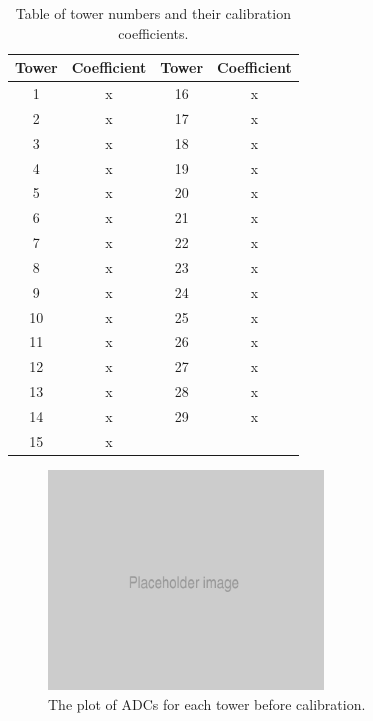 \begin{table}[h]
\centering
	\begin{tabular}{ c c | c c }
	\hline \hline
	\textbf{Tower} & \textbf{Coefficient} & \textbf{Tower} & \textbf{Coefficient} \\ \hline \hline
	 1 & x & 16 & x \\
	 2 & x & 17 & x \\
	 3 & x & 18 & x \\
	 4 & x & 19 & x \\
	 5 & x & 20 & x \\
	 6 & x & 21 & x \\
	 7 & x & 22 & x \\
	 8 & x & 23 & x \\
	 9 & x & 24 & x \\
	10 & x & 25 & x \\
	11 & x & 26 & x \\
	12 & x & 27 & x \\
	13 & x & 28 & x \\
	14 & x & 29 & x \\
	15 & x &    &    \\ \hline
	\end{tabular}
	\caption{Table of tower numbers and their calibration coefficients.}
	\label{table:idea/calibrationcoeffs}
\end{table}

\begin{figure}[h]
	\centering
	\includegraphics[width=0.65\textwidth]{../Pictures/Placeholder.png}
	\caption{The plot of ADCs for each tower before calibration.}
	\label{figure:testbeam/results/calibrationbefore}
\end{figure}


